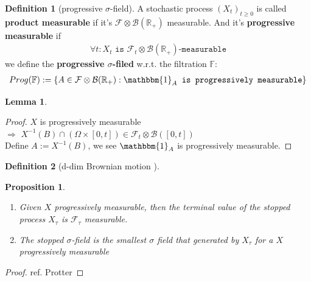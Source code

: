 \documentclass[a4paper,11pt]{book}
\newtheorem{lemma}[theorem]{Lemma}
\newtheorem{proposition}[theorem]{Proposition}
\theoremstyle{definition}
\newtheorem{definition}{Definition}[section]
\theoremstyle{remark}
\begin{document}
\begin{definition}[progressive $\sigma$-field]
	A stochastic process $(X_t)_{t \ge 0}$ is called \textbf{product measurable} if it's $\mathcal{F} \otimes \mathcal{B}(\mathbb{R}_+)$ measurable. And it's \textbf{progressive measurable} if 
	\begin{align*}
		\forall t : X_t \texttt{ is } \mathcal{F}_t \otimes \mathcal{B}(\mathbb{R}_+)\texttt{-measurable}
	\end{align*}
	we define the \textbf{progressive $\sigma$-filed} w.r.t. the filtration $\mathbb{F}$:
	\begin{align*}
		Prog(\mathbb{F}):= \{ A \in \mathcal{F} \otimes \mathcal{B}(\mathbb{R}_+): \mathbbm{1}_A \texttt{ is progressively measurable} \}
	\end{align*}
\end{definition}

\begin{lemma}
	
\end{lemma}
\begin{proof}
	$X$ is progressively measurable \\
	$\Rightarrow$ $X^{-1}(B) \cap (\Omega \times [0, t]) \in \mathcal{F}_t \otimes \mathcal{B}([0, t])$\\
	Define $A := X^{-1}(B)$, we see $\mathbbm{1}_A$ is progressively measurable. 
\end{proof}

\begin{definition}[d-dim Brownian motion ]
	
\end{definition}

\begin{proposition}
\quad
\begin{enumerate}
	\item Given $X$ progressively measurable, then the terminal value of the stopped process $X_\tau$ is $\mathcal{F}_\tau$ measurable. 
	\item The stopped $\sigma$-field is the smallest $\sigma$ field that generated by $X_\tau$ for a $X$ progressively measurable
\end{enumerate}
	
\end{proposition}
\begin{proof}
	ref. Protter 
\end{proof}
\end{document}
